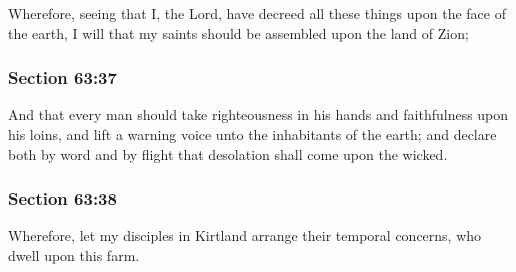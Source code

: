 		Wherefore, seeing that I, the Lord, have decreed all these things upon the face of the earth, I will that my saints should be assembled upon the land of Zion;


	\subsubsection{Section 63:37} %
		\label{DC63-37}

		And that every man should take righteousness in his hands and faithfulness upon his loins, and lift a warning voice unto the inhabitants of the earth; and declare both by word and by flight that desolation shall come upon the wicked.


	\subsubsection{Section 63:38} %
		\label{DC63-38}

		Wherefore, let my disciples in Kirtland arrange their temporal concerns, who dwell upon this farm.


